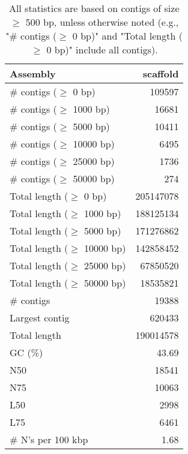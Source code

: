 \documentclass[12pt,a4paper]{article}
\begin{document}
\begin{table}[ht]
\begin{center}
\caption{All statistics are based on contigs of size $\geq$ 500 bp, unless otherwise noted (e.g., "\# contigs ($\geq$ 0 bp)" and "Total length ($\geq$ 0 bp)" include all contigs).}
\begin{tabular}{|l*{1}{|r}|}
\hline
Assembly & scaffold \\ \hline
\# contigs ($\geq$ 0 bp) & 109597 \\ \hline
\# contigs ($\geq$ 1000 bp) & 16681 \\ \hline
\# contigs ($\geq$ 5000 bp) & 10411 \\ \hline
\# contigs ($\geq$ 10000 bp) & 6495 \\ \hline
\# contigs ($\geq$ 25000 bp) & 1736 \\ \hline
\# contigs ($\geq$ 50000 bp) & 274 \\ \hline
Total length ($\geq$ 0 bp) & 205147078 \\ \hline
Total length ($\geq$ 1000 bp) & 188125134 \\ \hline
Total length ($\geq$ 5000 bp) & 171276862 \\ \hline
Total length ($\geq$ 10000 bp) & 142858452 \\ \hline
Total length ($\geq$ 25000 bp) & 67850520 \\ \hline
Total length ($\geq$ 50000 bp) & 18535821 \\ \hline
\# contigs & 19388 \\ \hline
Largest contig & 620433 \\ \hline
Total length & 190014578 \\ \hline
GC (\%) & 43.69 \\ \hline
N50 & 18541 \\ \hline
N75 & 10063 \\ \hline
L50 & 2998 \\ \hline
L75 & 6461 \\ \hline
\# N's per 100 kbp & 1.68 \\ \hline
\end{tabular}
\end{center}
\end{table}
\end{document}
